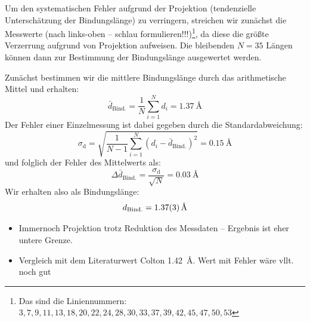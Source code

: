 \documentclass[10pt, a4paper]{article}
\begin{document}
Um den systematischen Fehler aufgrund der Projektion (tendenzielle Unterschätzung der Bindungslänge) zu verringern, streichen wir zunächst die Messwerte (nach links-oben -- schlau formulieren!!!)\footnote{Das sind die Liniennummern: $3,7,9,11,13,18,20,22,24,28,30,33,37,39,42,45,47,50,53$}, da diese die größte Verzerrung aufgrund von Projektion aufweisen.
Die bleibenden $N = \num{35}$ Längen können dann zur Bestimmung der Bindungslänge ausgewertet werden.

Zunächst bestimmen wir die mittlere Bindungslänge durch das arithmetische Mittel und erhalten:
\begin{equation}
  \bar{d}_\mathrm{Bind.} = \frac{1}{N} \sum_{i=1}^N d_i= \SI{1,37}{\angstrom}
\end{equation}
Der Fehler einer Einzelmessung ist dabei gegeben durch die Standardabweichung:
\begin{equation}
  \sigma_\mathrm{d} = \sqrt{\frac{1}{N-1} \sum_{i=1}^N (d_i - \bar{d}_\mathrm{Bind.})^2} = \SI{0,15}{\angstrom}
\end{equation}
und folglich der Fehler des Mittelwerts als:
\begin{equation}
  \Delta \bar{d}_\mathrm{Bind.} = \frac{\sigma_\mathrm{d}}{\sqrt{N}} = \SI{0,03}{\angstrom}
\end{equation}
Wir erhalten also als Bindungslänge:
\begin{equation}
  d_\mathrm{Bind.} = \SI{1,37 +- 0,03}{\angstrom}
\end{equation}
\begin{itemize}
  \item Immernoch Projektion trotz Reduktion des Messdaten -- Ergebnis ist eher untere Grenze.
  \item Vergleich mit dem Literaturwert Colton \SI{1,42}{\angstrom}. Wert mit Fehler wäre vllt. noch gut
\end{itemize}
\end{document}
